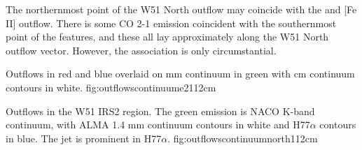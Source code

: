 \documentclass{aa}
\begin{document}
The northernmost point of the W51 North outflow may coincide with
the \citet{Hodapp2002a} \hh and [Fe II] outflow.  There is some CO 2-1
emission coincident with the southernmost point of the \hh features,
and these all lay approximately along the W51 North outflow vector.
However, the association is only circumstantial.


{Outflows in red and blue overlaid on mm continuum in green with cm continuum contours in white.}
{fig:outflowscontinuume2}{1}{12cm}

{Outflows in the W51 IRS2 region.  The green emission is NACO K-band continuum,
with ALMA 1.4 mm continuum contours in white and H77$\alpha$ contours in blue.
The \citet{Lacy2007a} jet is prominent in H77$\alpha$.}
{fig:outflowscontinuumnorth}{1}{12cm}
\end{document}
